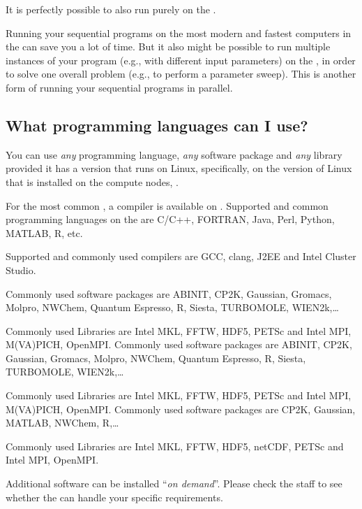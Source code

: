 It is perfectly possible to also run purely  on the
\hpc.

Running your sequential programs on the most modern and fastest computers in
the \hpc can save you a lot of time.  But it also might be possible to run
multiple instances of your program (e.g., with different input parameters) on
the \hpc, in order to solve one overall problem (e.g., to perform a parameter
sweep). This is another form of running your sequential programs in parallel.

\subsection{What programming languages can I use?}
\label{sec:what-programming-languages-can-i-use}

You can use \emph{any} programming language, \emph{any} software package and
\emph{any} library provided it has a version that runs on Linux, specifically,
on the version of Linux that is installed on the compute nodes, \operatingsystembase.

For the most common , a compiler is available on
\operatingsystem. Supported and common programming languages on the \hpc are
C/C++, FORTRAN, Java, Perl, Python, MATLAB, R, etc.

Supported and commonly used compilers are GCC, clang, J2EE and Intel Cluster
Studio.


\ifantwerpen
Commonly used software packages are ABINIT, CP2K, Gaussian, Gromacs, Molpro,
NWChem, Quantum Espresso, R, Siesta, TURBOMOLE, WIEN2k,\ldots

Commonly used Libraries are Intel MKL, FFTW, HDF5, PETSc and Intel MPI, M(VA)PICH, OpenMPI.
\fi
\ifleuven
Commonly used software packages are ABINIT, CP2K, Gaussian, Gromacs, Molpro,
NWChem, Quantum Espresso, R, Siesta, TURBOMOLE, WIEN2k,\ldots

Commonly used Libraries are Intel MKL, FFTW, HDF5, PETSc and Intel MPI, M(VA)PICH, OpenMPI.
\fi
\ifbrussel
Commonly used software packages are CP2K, Gaussian, MATLAB, NWChem, R,\ldots

Commonly used Libraries are Intel MKL, FFTW, HDF5, netCDF, PETSc and Intel MPI, OpenMPI.
\fi

Additional software can be installed ``\emph{on demand}''. Please check the
\hpc staff to see whether the \hpc can handle your specific requirements.

